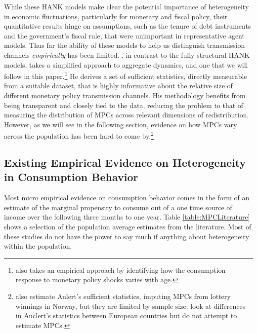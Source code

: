 \documentclass[titlepage]{\econtex}\newcommand{\texname}{ConsumptionHeterogeneity}
\begin{document}
While these HANK models make clear the potential importance of heterogeneity in economic fluctuations, particularly for monetary and fiscal policy, their quantitative results hinge on assumptions, such as the tenure of debt instruments and the government's fiscal rule, that were unimportant in representative agent models. Thus far the ability of these models to help us distinguish transmission channels \textit{empirically} has been limited. \cite{auclert_monetary_2017}, in contrast to the fully structural HANK models, takes a simplified approach to aggregate dynamics, and one that we will follow in this paper.\footnote{\cite{wong_population_2016} also takes an empirical approach by identifying how the consumption response to monetary policy shocks varies with age.} He derives a set of sufficient statistics, directly measurable from a suitable dataset, that is highly informative about the  relative size of different monetary policy transmission channels. His methodology benefits from being transparent and closely tied to the data, reducing the problem to that of measuring the distribution of MPCs across relevant dimensions of redistribution. However, as we will see in the following section, evidence on how MPCs vary across the population has been hard to come by.\footnote{\cite{fagereng_mpc_2016} also estimate Aulert's sufficient statistics, imputing MPCs from lottery winnings in Norway, but they are limited by sample size. \cite{ampudia_monetary_2018} look at differences in Auclert's statistics between European countries but do not attempt to estimate MPCs.} 

\subsection{Existing Empirical Evidence on Heterogeneity in Consumption Behavior} \label{MPCEmpirics}
Most micro empirical evidence on consumption behavior comes in the form of an estimate of the marginal propensity to consume out of a one time source of income over the following three months to one year. Table \ref{table:MPCLiterature} shows a selection of the population average estimates from the literature. Most of these studies do not have the power to say much if anything about heterogeneity within the population.
\end{document}
